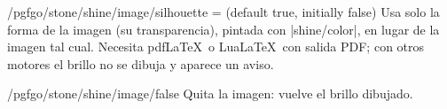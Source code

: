 \begin{key}{/pgfgo/stone/shine/image/silhouette =  (default true, initially false)}
	Usa solo la forma de la imagen (su transparencia), pintada con |shine/color|, en lugar de la imagen tal cual. Necesita pdf\LaTeX\ o Lua\LaTeX\ con salida PDF; con otros motores el brillo no se dibuja y aparece un aviso.

	\begin{codeexample}[width=4cm]

		\begin{goban}
		\end{goban}
	\end{codeexample}
\end{key}

\begin{stylekey}{/pgfgo/stone/shine/image/false}
	Quita la imagen: vuelve el brillo dibujado.
\end{stylekey}


